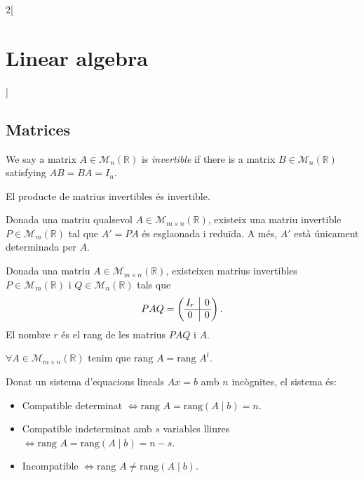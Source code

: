\documentclass[class=article,10pt,crop=false]{standalone}
\begin{document}
\begin{multicols}{2}[\section{Linear algebra}]
\subsection{Matrices}
\begin{definition}
We say a matrix $A\in\mathcal{M}_n(\mathbb{R})$ is \textit{invertible} if there is a matrix $B\in\mathcal{M}_n(\mathbb{R})$ satisfying $AB=BA=I_n$.
\end{definition}
\begin{lemma}
El producte de matrius invertibles és invertible.
\end{lemma}
\begin{theorem}
Donada una matriu qualsevol $A\in\mathcal{M}_{m\times n}(\mathbb{R})$, existeix una matriu invertible $P\in\mathcal{M}_m(\mathbb{R})$ tal que $A'=PA$ és esglaonada i reduïda. A més, $A'$ està únicament determinada per $A$.
\end{theorem}
\begin{theorem}
Donada una matriu $A\in\mathcal{M}_{m\times n}(\mathbb{R})$, existeixen matrius invertibles $P\in\mathcal{M}_m(\mathbb{R})$ i $Q\in\mathcal{M}_n(\mathbb{R})$ tals que $$PAQ=\left(\begin{array}{@{\,} c|c @{\,}}
    I_r & 0\\
    \hline
    0 & 0
    \end{array}\right).$$ El nombre $r$ és el rang de les matrius $PAQ$ i $A$.
\end{theorem}
\begin{prop}
$\forall A\in\mathcal{M}_{m\times n}(\mathbb{R})$ tenim que $\text{rang }A=\text{rang }A^t$.
\end{prop}
\begin{theorem}
Donat un sistema d'equacions lineals $Ax=b$ amb $n$ incògnites, el sistema és:
\begin{itemize}
    \item Compatible determinat $\iff\text{rang }A=\text{rang}(A\mid b)=n$.
    \item Compatible indeterminat amb $s$ variables lliures $\iff\text{rang }A=\text{rang}(A\mid b)=n-s$.
    \item Incompatible $\iff\text{rang }A\ne\text{rang}(A\mid b)$.
\end{itemize}

\end{theorem}
\end{multicols}
\end{document}
